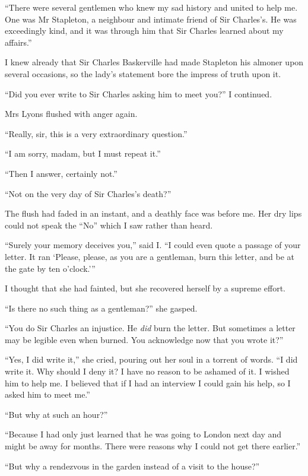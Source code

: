 \documentclass[paper=5.5in:8.5in,BCOR=7mm,twoside,DIV=calc,12pt,usegeometry,openany,chapterprefix,endperiod,headings=big]{scrbook} %
\begin{document}
\enquote{There were several gentlemen who knew my sad history and united to help me. One was Mr Stapleton, a neighbour and intimate friend of Sir Charles's. He was exceedingly kind, and it was through him that Sir Charles learned about my affairs.}

I knew already that Sir Charles Baskerville had made Stapleton his almoner upon several occasions, so the lady's statement bore the impress of truth upon it.

\enquote{Did you ever write to Sir Charles asking him to meet you?} I continued.

Mrs Lyons flushed with anger again.

\enquote{Really, sir, this is a very extraordinary question.}

\enquote{I am sorry, madam, but I must repeat it.}

\enquote{Then I answer, certainly not.}

\enquote{Not on the very day of Sir Charles's death?}

The flush had faded in an instant, and a deathly face was before me. Her dry lips could not speak the \enquote{No} which I saw rather than heard.

\enquote{Surely your memory deceives you,} said I. \enquote{I could even quote a passage of your letter. It ran \enquote{Please, please, as you are a gentleman, burn this letter, and be at the gate by ten o'clock.}}

I thought that she had fainted, but she recovered herself by a supreme effort.

\enquote{Is there no such thing as a gentleman?} she gasped.

\enquote{You do Sir Charles an injustice. He \emph{did} burn the letter. But sometimes a letter may be legible even when burned. You acknowledge now that you wrote it?}

\enquote{Yes, I did write it,} she cried, pouring out her soul in a torrent of words. \enquote{I did write it. Why should I deny it? I have no reason to be ashamed of it. I wished him to help me. I believed that if I had an interview I could gain his help, so I asked him to meet me.}

\enquote{But why at such an hour?}

\enquote{Because I had only just learned that he was going to London next day and might be away for months. There were reasons why I could not get there earlier.}

\enquote{But why a rendezvous in the garden instead of a visit to the house?}
\end{document}
